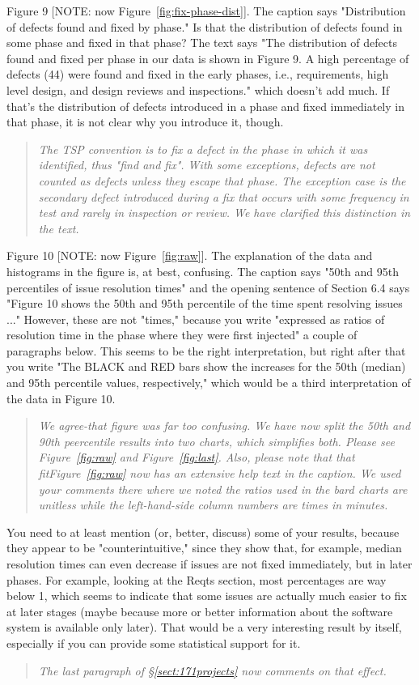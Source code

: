 \documentclass[smallcondensed]{svjour3}
\newcommand{\tion}[1]{\S\ref{sect:#1}}
\newcommand{\fig}[1]{Figure~\ref{fig:#1}}
\begin{document}
Figure 9 [NOTE: now \fig{fix-phase-dist}]. The caption says "Distribution of defects found
and fixed by phase." Is that the distribution of defects
found in some phase and fixed in that phase? The text says
"The distribution of defects found and fixed per phase in
our data is shown in Figure 9. A high percentage of defects
(44) were found and fixed in the early phases, i.e.,
requirements, high level design, and design reviews and
inspections." which doesn't add much. If that's the
distribution of defects introduced in a phase and fixed
immediately in that phase, it is not clear why you introduce
it, though.
\begin{quote}
{\em 
The TSP convention is to fix a defect in the phase in which it was identified, thus "find and fix". With some exceptions, defects are not counted as defects unless they escape that phase. The exception case is the secondary defect introduced during a fix that occurs with some frequency in test and rarely in inspection or review. We have clarified this distinction in the text.}
\end{quote}
Figure 10 [NOTE: now \fig{raw}]. The explanation of the data and histograms in the
figure is, at best, confusing. The caption says "50th and
95th percentiles of issue resolution times" and the opening
sentence of Section 6.4 says "Figure 10 shows the 50th and
95th percentile of the time spent resolving issues ..."
However, these are not "times," because you write "expressed
as ratios of resolution time in the phase where they were
first injected" a couple of paragraphs below. This seems to
be the right interpretation, but right after that you write
"The BLACK and RED bars show the increases for the 50th
(median) and 95th percentile values, respectively," which
would be a third interpretation of the data in Figure 10.
\begin{quote}
{\em We agree-that figure was far too confusing. We have now split the 50th and 90th peercentile results
into two charts, which simplifies both. Please see \fig{raw} and \fig{last}.
Also, please note that that fit\fig{raw} now has an extensive help text in the caption.
We used your comments there where we noted the ratios used in the
bard charts are unitless while the left-hand-side column numbers are
times in minutes.
}
\end{quote}
 
You need to at least mention (or, better, discuss) some of
your results, because they appear to be "counterintuitive,"
since they show that, for example, median resolution times
can even decrease if issues are not fixed immediately, but
in later phases. For example, looking at the Reqts section,
most percentages are way below 1, which seems to indicate
that some issues are actually much easier to fix at later
stages (maybe because more or better information about the
software system is available only later). That would be a
very interesting result by itself, especially if you can
provide some statistical support for it.
\begin{quote}{\em
The last paragraph of \tion{171projects} now comments
on that effect. }
\end{quote}
 
\end{document}
